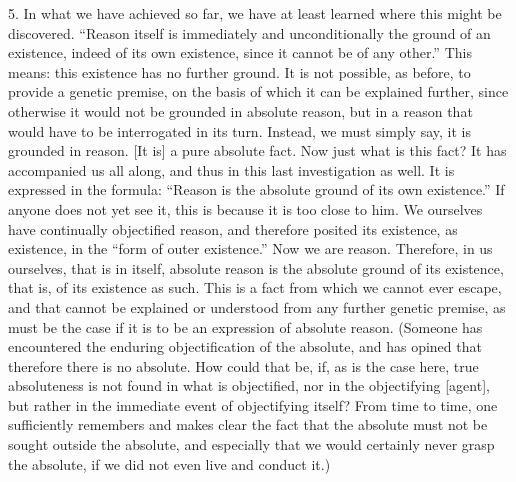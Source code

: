 5. In what we have achieved so far,
we have at least learned where this might be discovered.
“Reason itself is immediately and unconditionally
the ground of an existence, indeed of its own existence,
since it cannot be of any other.”
This means:
this existence has no further ground.
It is not possible, as before, to provide a genetic premise,
on the basis of which it can be explained further,
since otherwise it would not be grounded in absolute reason,
but in a reason that would have to be interrogated in its turn.
Instead, we must simply say, it is grounded in reason.
[It is] a pure absolute fact.
Now just what is this fact?
It has accompanied us all along,
and thus in this last investigation as well.
It is expressed in the formula:
“Reason is the absolute ground of its own existence.”
If anyone does not yet see it,
this is because it is too close to him.
We ourselves have continually objectified reason,
and therefore posited its existence, as existence,
in the “form of outer existence.”
Now we are reason.
Therefore, in us ourselves, that is in itself,
absolute reason is the absolute ground of its existence,
that is, of its existence as such.
This is a fact from which we cannot ever escape,
and that cannot be explained or understood
from any further genetic premise,
as must be the case if it is to be
an expression of absolute reason.
(Someone has encountered the enduring
objectification of the absolute,
and has opined that therefore there is no absolute.
How could that be, if, as is the case here,
true absoluteness is not found in what is objectified,
nor in the objectifying [agent],
but rather in the immediate event of objectifying itself?
From time to time, one sufficiently remembers and makes clear
the fact that the absolute must not be sought outside the absolute,
and especially that we would certainly never grasp the absolute,
if we did not even live and conduct it.)

